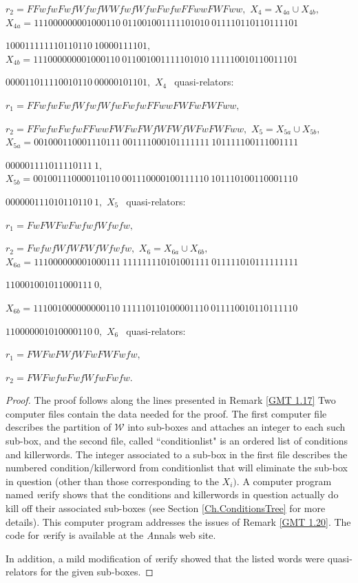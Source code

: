\begin{theorem}
$r_2 = FFwfwFwfWfwfWWfwfWfwFwfwFFwwFWFww,$
\noindent $X_4 = X_{4a} \cup X_{4b},$
\noindent $X_{4a} = 
111000000001000110\ 
011001001111101010\ 
011110110110111101$\hfill

\hfill  
$100011111110110110\ 
10000111101,$
\noindent $X_{4b} = 
111000000001000110\ 
011001001111101010\ 
111110010110011101$\hfill

\hfill  
$000011011110010110\ 
00000101101,$
\noindent $X_4\ \ $ quasi\/{\textrm -}\/relators\/{\textrm :}

$r_1 = FFwfwFwfWfwfWfwFwfwFFwwFWFwFWFww,$

$r_2 = FFwfwFwfwFFwwFWFwFWfWFWfWFwFWFww,$
\noindent $X_5 = X_{5a} \cup X_{5b},$
\noindent $X_{5a} = 
001000110001110111\ 
001111000101111111\ 
101111100111001111$\hfill

\hfill 
$000001111011110111\ 1,$
\noindent  $X_{5b} = 
001001110000110110\ 
001110000100111110\ 
101110100110001110$\hfill

\hfill  
$000000111010110110\ 1,$
\vglue4pt
\noindent $X_5\ \ $ quasi\/{\textrm -}\/relators\/{\textrm :}

$r_1 = FwFWFwFwfwfWfwfw,$

$r_2 = FwfwfWfWFWfWfwfw,$
\vfil
\noindent $X_6 = X_{6a} \cup X_{6b},$
\vfil
\noindent $X_{6a} = 
111000000001000111\ 
111111110101001111\ 
011111010111111111$\hfill

\hfill  
$110001001011000111\ 0,$

\noindent $X_{6b} = 
111001000000000110\ 
111110110100001110\ 
011110010110111110$\hfill

\hfill  
$110000001010000110\ 0,$
\vglue4pt
\noindent $X_6\ \ $ quasi\/{\textrm -}\/relators\/{\textrm :}\/

$r_1 = FWFwFWfWFwFWFwfw,$

$r_2 = FWFwfwFwfWfwFwfw.$
\end{theorem}

 
\begin{proof}{}  
The proof follows along the lines presented in
Remark \ref{GMT 1.17}
Two computer files contain the data needed for the proof.   
The first computer file describes the partition of $\mathcal {W}$ into
sub-boxes and attaches an integer to each such sub-box, 
and the second file, called ``conditionlist" is an ordered list of conditions and killerwords.
The integer associated to a sub-box in the first file describes the numbered condition/killerword from   conditionlist that will eliminate the sub-box
in question (other than those corresponding to the $X_i).$ A computer program named {\textit verify} shows
that the conditions and killerwords in question actually do kill off their associated sub-boxes (see
	Section \ref{Ch.ConditionsTree}
	for more details).  This computer
program addresses the issues of Remark \ref{GMT 1.20}.  The code for {\textit
verify} is available at the {\textit Annals} web site. 

In addition, a mild modification of {\textit verify} showed that the listed words were quasi-relators for the given sub-boxes. 
\end{proof}

